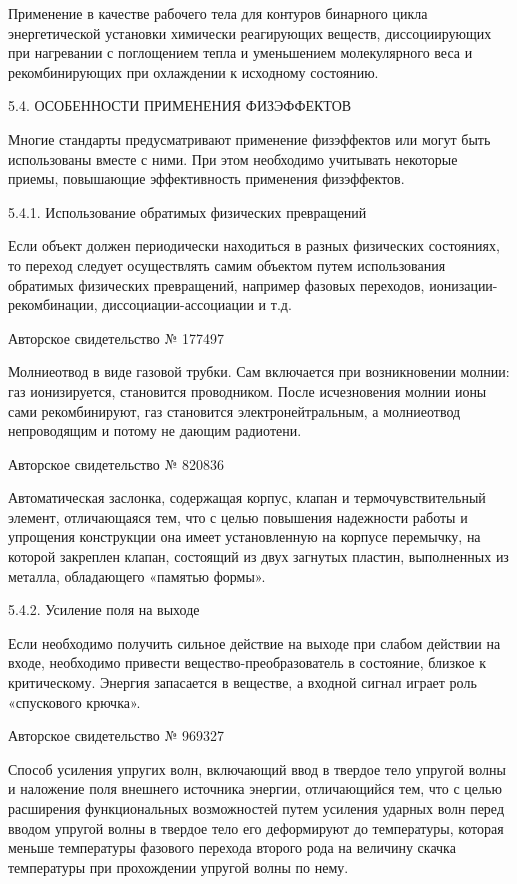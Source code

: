 Применение  в  качестве рабочего  тела  для  контуров бинарного  цикла
энергетической установки химически реагирующих веществ, диссоциирующих
при нагревании с поглощением тепла  и уменьшением молекулярного веса и
рекомбинирующих при охлаждении к исходному состоянию.

5.4. ОСОБЕННОСТИ ПРИМЕНЕНИЯ ФИЗЭФФЕКТОВ

Многие стандарты предусматривают применение физэффектов или могут быть
использованы вместе  с ними.  При этом необходимо  учитывать некоторые
приемы, повышающие эффективность применения физэффектов.

5.4.1. Использование обратимых физических превращений

Если  объект  должен  периодически   находиться  в  разных  физических
состояниях,  то  переход  следует осуществлять  самим  объектом  путем
использования  обратимых  физических   превращений,  например  фазовых
переходов, ионизации-рекомбинации, диссоциации-ассоциации и т.д.

Авторское свидетельство № 177497

Молниеотвод в  виде газовой  трубки. Сам включается  при возникновении
молнии: газ  ионизируется, становится проводником.  После исчезновения
молнии ионы  сами рекомбинируют, газ становится  электронейтральным, а
молниеотвод непроводящим и потому не дающим радиотени.


Авторское свидетельство № 820836

Автоматическая     заслонка,    содержащая     корпус,    клапан     и
термочувствительный элемент,  отличающаяся тем, что с  целью повышения
надежности работы  и упрощения конструкции она  имеет установленную на
корпусе  перемычку, на  которой  закреплен клапан,  состоящий из  двух
загнутых пластин, выполненных из металла, обладающего «памятью формы».

5.4.2. Усиление поля на выходе

Если  необходимо  получить  сильное  действие  на  выходе  при  слабом
действии  на  входе,  необходимо привести  вещество-преобразователь  в
состояние, близкое  к критическому.  Энергия запасается в  веществе, а
входной сигнал играет роль «спускового крючка».

Авторское свидетельство № 969327

Способ усиления упругих  волн, включающий ввод в  твердое тело упругой
волны и  наложение поля внешнего источника  энергии, отличающийся тем,
что  с целью  расширения  функциональных  возможностей путем  усиления
ударных волн перед вводом упругой волны в твердое тело его деформируют
до температуры,  которая меньше температуры фазового  перехода второго
рода на величину  скачка температуры при прохождении  упругой волны по
нему.

